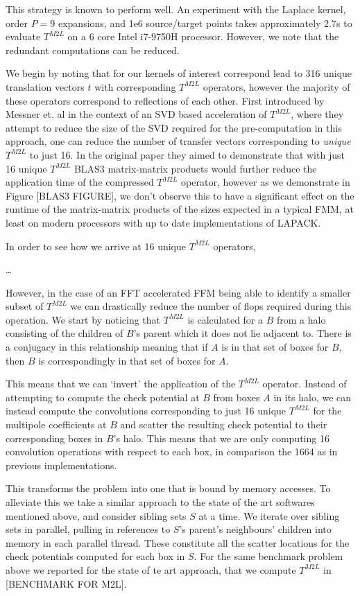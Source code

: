 This strategy is known to perform well. An experiment with the Laplace kernel, order $P=9$ expansions, and 1e6 source/target points takes approximately 2.7s to evaluate $T^{M2L}$ on a 6 core Intel i7-9750H processor. However, we note that the redundant computations can be reduced.

We begin by noting that for our kernels of interest correspond lead to 316 unique translation vectors $t$ with corresponding $T^{M2L}$ operators, however the majority of these operators correspond to reflections of each other. First introduced by Messner et. al \cite{messner2012optimized} in the context of an SVD based acceleration of $T^{M2L}$, where they attempt to reduce the size of the SVD required for the pre-computation in this approach, one can reduce the number of transfer vectors corresponding to \textit{unique} $T^{M2L}$ to just 16. In the original paper they aimed to demonstrate that with just 16 unique $T^{M2L}$ BLAS3 matrix-matrix products would further reduce the application time of the compressed $T^{M2L}$ operator, however as we demonstrate in Figure [BLAS3 FIGURE], we don't observe this to have a significant effect on the runtime of the matrix-matrix products of the sizes expected in a typical FMM, at least on modern processors with up to date implementations of LAPACK.

In order to see how we arrive at 16 unique $T^{M2L}$ operators,

\dots

However, in the case of an FFT accelerated FFM being able to identify a smaller subset of $T^{M2L}$ we can drastically reduce the number of flops required during this operation. We start by noticing that $T^{M2L}$ is calculated for a $B$ from a halo consisting of the children of $B$'s parent which it does not lie adjacent to. There is a conjugacy in this relationship meaning that if $A$ is in that set of boxes for $B$, then $B$ is correspondingly in that set of boxes for $A$.

This means that we can `invert' the application of the $T^{M2L}$ operator. Instead of attempting to compute the check potential at $B$ from boxes $A$ in its halo, we can instead compute the convolutions corresponding to just 16 unique $T^{M2L}$ for the multipole coefficients at $B$ and scatter the resulting check potential to their corresponding boxes in $B$'s halo. This means that we are only computing 16 convolution operations with respect to each box, in comparison the 1664 as in previous implementations.

This transforms the problem into one that is bound by memory accesses. To alleviate this we take a similar approach to the state of the art softwares mentioned above, and consider sibling sets $S$ at a time. We iterate over sibling sets in parallel, pulling in references to $S$'s parent's neighbours' children into memory in each parallel thread. These constitute all the scatter locations for the check potentials computed for each box in $S$. For the same benchmark problem above we reported for the state of te art approach, that we compute $T^{M2L}$ in [BENCHMARK FOR M2L].

